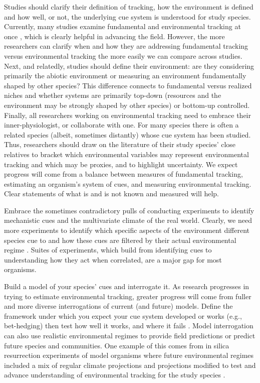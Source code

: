 \documentclass[11pt,letterpaper]{article}
\begin{document}
Studies should clarify their definition of tracking, how the environment is defined and how well, or not, the underlying cue system is understood for study species. Currently, many studies examine fundamental and environmental tracking at once \citep[e.g.,][]{yang2020}, which is clearly helpful in advancing the field. However, the more researchers can clarify when and how they are addressing fundamental tracking versus environmental tracking the more easily we can compare across studies. Next, and relatedly, studies should define their environment: are they considering primarily the abiotic environment or measuring an environment fundamentally shaped by other species? This difference connects to fundamental versus realized niches and  whether systems are primarily top-down (resources and the environment may be strongly shaped by other species) or bottom-up controlled. Finally, all researchers working on environmental tracking need to embrace their inner-physiologist, or collaborate with one. For many species there is often a related species (albeit, sometimes distantly) whose cue system has been studied. Thus, researchers should draw on the literature of their study species' close relatives to bracket which environmental variables may represent environmental tracking and which may be proxies, and to highlight uncertainty. We expect progress will come from a balance between measures of fundamental tracking, estimating an organism's system of cues, and measuring environmental tracking. Clear statements of what is and is not known and measured will help. 

Embrace the sometimes contradictory pulls of conducting experiments to identify mechanistic cues and the multivariate climate of the real world. Clearly, we need more experiments to identify which specific aspects of the environment different species cue to and how these cues are filtered by their actual environmental regime \citep[as outlined above and see][]{chmura2019}. Suites of experiments, which build from identifying cues to understanding how they act when correlated, are a major gap for most organisms. 

Build a model of your species' cues and interrogate it. As research progresses in trying to estimate environmental tracking, greater progress will come from fuller and more diverse interrogations of current (and future) models. Define the framework under which you expect your cue system developed or works (e.g., bet-hedging) then test how well it works, and where it fails \citep[see][for an example]{johanOCR}. Model interrogation can also use realistic environmental regimes to provide field predictions \citep{Wilczek:2010ad,Wilczek:2009oa} or predict future species and communities. One example of this comes from in silica resurrection experiments of model organisms where future environmental regimes included a mix of regular climate projections and projections modified to test and advance understanding of environmental tracking for the study species \citep[e.g., warmer winter and altered photoperiod scenarios in][]{fournier2016}.\\
\end{document}
